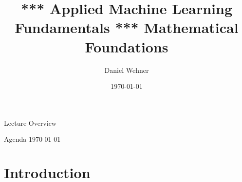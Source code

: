 
\usepackage{hyperref}
\usepackage{movie15}


\title[Mathematical Foundations]{*** Applied Machine Learning Fundamentals *** Mathematical Foundations}
\author{Daniel Wehner}
\date{\today}




\maketitlepage


\begin{frame}{Lecture Overview}{}
\end{frame}


\begin{frame}{Agenda \today}
	\begin{multicols}{2}
		\tableofcontents
	\end{multicols}
\end{frame}


\section{Introduction}

